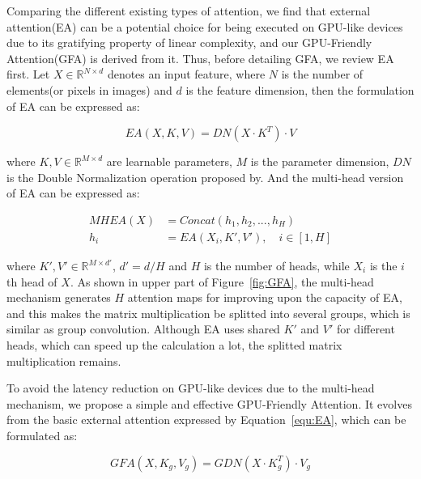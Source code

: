 \documentclass{article}
\begin{document}
Comparing the different existing types of attention, we find that external attention\cite{guo2021beyond}(EA) can be a potential choice for being executed on GPU-like devices due to its gratifying property of linear complexity, and our GPU-Friendly Attention(GFA) is derived from it. Thus, before detailing GFA, we review EA first. Let $X \in \mathbb{R}^{N\times d}$ denotes an input feature, where $N$ is the number of elements(or pixels in images) and $d$ is the feature dimension, then the formulation of EA can be expressed as:

\begin{equation}
EA(X, K, V) = DN(X\cdot K^T)\cdot V
    \label{equ:EA}
\end{equation}

where $K, V \in \mathbb{R}^{M\times d}$ are learnable parameters, $M$ is the parameter dimension, $DN$ is the Double Normalization operation proposed by\cite{guo2021beyond}. And the multi-head version of EA can be expressed as:

\begin{equation}
    \begin{aligned}
MHEA(X) &= Concat(h_1, h_2, ... , h_H)\\
        h_i &= EA(X_i, K', V'),\quad i \in [1, H]
    \end{aligned}
\end{equation}

where $K', V' \in \mathbb{R}^{M\times d'}$, $d' = d / H$ and $H$ is the number of heads, while $X_i$ is the $i$th head of $X$. As shown in upper part of Figure~\ref{fig:GFA}, the multi-head mechanism generates $H$ attention maps for improving upon the capacity of EA, and this makes the matrix multiplication be splitted into several groups, which is similar as group convolution. Although EA uses shared $K'$ and $V'$ for different heads, which can speed up the calculation a lot, the splitted matrix multiplication remains.

To avoid the latency reduction on GPU-like devices due to the multi-head mechanism, we propose a simple and effective GPU-Friendly Attention. It evolves from the basic external attention expressed by Equation~\ref{equ:EA}, which can be formulated as:

\begin{equation}
GFA(X, K_g, V_g) = GDN(X\cdot K_g^T)\cdot V_g
    \label{equ:GFA}
\end{equation}
\end{document}
